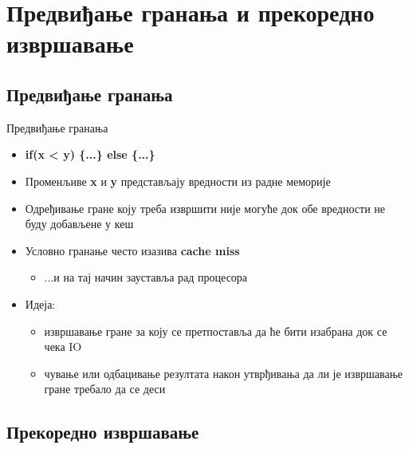 \documentclass[xcolor=table]{beamer}
\begin{document}
    \section{Предвиђање гранања и прекоредно извршавање}
    \subsection{Предвиђање гранања}
    
    \begin{frame}{Предвиђање гранања}
        \begin{itemize}
            \item \textbf{if(x < y) \{...\} else \{...\}}
            \item Променљиве \textbf{x} и \textbf{y} представљају вредности из радне меморије 
            \item Одређивање гране коју треба извршити није могуће док обе вредности не буду добављене у кеш
            \item Условно гранање често изазива \textbf{cache miss}
            \begin{itemize}
                \item ...и на тај начин зауставља рад процесора
            \end{itemize}
            \item Идеја:
            \begin{itemize}
                \item извршавање гране за коју се претпоставља да ће бити изабрана док се чека IO
                \item чување или одбацивање резултата након утврђивања да ли је извршавање гране требало да се деси
            \end{itemize}
        \end{itemize}
    \end{frame}
    
    \subsection{Прекоредно извршавање}
    
\end{document}
